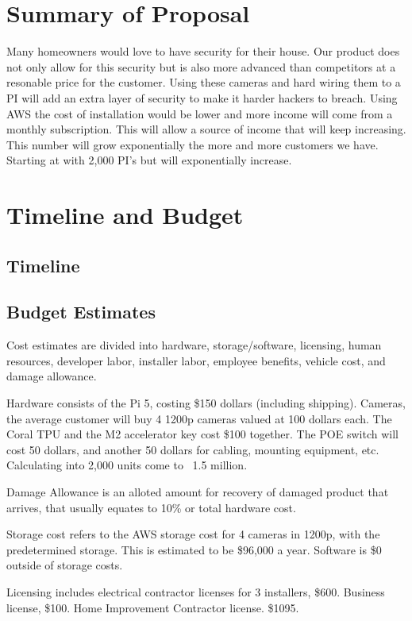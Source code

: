 \documentclass{report}
\begin{document}
\chapter{Summary of Proposal}
Many homeowners would love to have security for their house.
Our product does not only allow for this security but is also more advanced than competitors at a resonable price for the customer.
Using these cameras and hard wiring them to a PI will add an extra layer of security to make it harder hackers to breach.
Using AWS the cost of installation would be lower and more income will come from a monthly subscription. This will allow a source of income that will keep increasing.
This number will grow exponentially the more and more customers we have. Starting at with 2,000 PI's but will exponentially increase.




\chapter{Timeline and Budget}
\section{Timeline}

\section{Budget Estimates}
Cost estimates are divided into hardware, 
storage/software, licensing, human resources,
developer labor, installer labor, employee benefits, 
vehicle cost, and damage allowance.

Hardware consists of the Pi 5, costing \$150 dollars (including shipping). Cameras, 
the average customer will buy 4 1200p cameras valued at 100 dollars each. 
The Coral TPU and the M2 accelerator key cost \$100 together.
The POE switch will cost 50 dollars, and another 50 dollars for cabling, mounting equipment, etc. Calculating into 2,000 units come to ~1.5 million.

Damage Allowance is an alloted amount for recovery of damaged product that arrives, that usually equates to 10\% or total hardware cost.

Storage cost refers to the AWS storage cost for 4 cameras in 1200p, with the predetermined storage. This is estimated to be \$96,000 a year.
Software is \$0 outside of storage costs.

Licensing includes electrical contractor licenses for 3 installers, \$600. Business license, \$100. 
Home Improvement Contractor license. \$1095.
\end{document}
